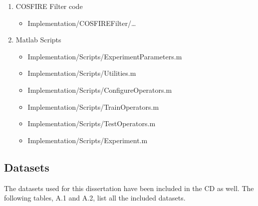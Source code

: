     \begin{enumerate}
        \item COSFIRE Filter code
            \begin{itemize}
              \item Implementation/COSFIREFilter/\ldots
            \end{itemize}
        \item Matlab Scripts
            \begin{itemize}
                  \item Implementation/Scripts/ExperimentParameters.m
                  \item Implementation/Scripts/Utilities.m
                  \item Implementation/Scripts/ConfigureOperators.m
                  \item Implementation/Scripts/TrainOperators.m
                  \item Implementation/Scripts/TestOperators.m
                  \item Implementation/Scripts/Experiment.m
            \end{itemize}
    \end{enumerate}

\subsection{Datasets}
The datasets used for this dissertation have been included in the CD as well. The following tables, A.1 and A.2, list all the included datasets.

